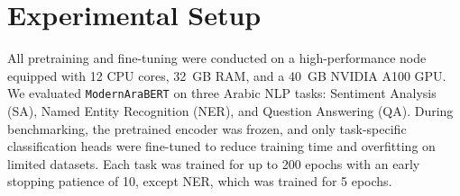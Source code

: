 \section{Experimental Setup}
All pretraining and fine-tuning were conducted on a high-performance node equipped with 12 CPU cores, 32~GB RAM, and a 40~GB NVIDIA A100 GPU. We evaluated \texttt{ModernAraBERT} on three Arabic NLP tasks: Sentiment Analysis (SA), Named Entity Recognition (NER), and Question Answering (QA). During benchmarking, the pretrained encoder was frozen, and only task-specific classification heads were fine-tuned to reduce training time and overfitting on limited datasets. Each task was trained for up to 200 epochs with an early stopping patience of 10, except NER, which was trained for 5 epochs.





